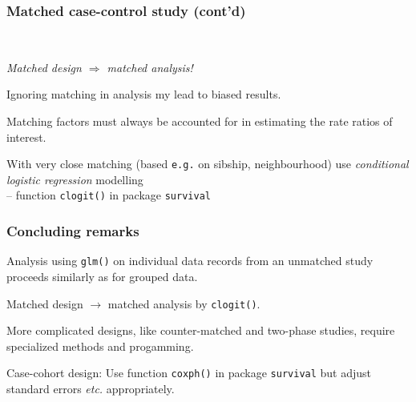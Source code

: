 \documentclass[handout,12pt]{beamer}
\begin{document}

\begin{frame}
\frametitle{Matched case-control study (cont'd)}
\ \\
\bi
\item
{\it Matched design $\Rightarrow$ matched analysis!}
\medskip
\item
Ignoring matching in analysis my lead to biased results.
\medskip
\item
Matching factors must always be accounted 
for in estimating the rate ratios of interest. 
\medskip
\item
With very close matching (based {\tt e.g.} on sibship, neighbourhood)
 use {\it  conditional logistic regression} modelling \\
 -- function {\tt clogit()} in package {\tt survival}
\ei

\end{frame} 

\begin{frame}
\frametitle{Concluding remarks}
\bi

\item
Analysis using {\tt glm()} on individual data records from 
an unmatched study proceeds similarly as for grouped data.
\medskip
\item
Matched design $\to$ matched analysis by \texttt{clogit()}.
\medskip
\item
More complicated designs, like counter-matched and two-phase studies,
require specialized methods and progamming.
\medskip
\item
Case-cohort design: Use function {\tt coxph()} in package {\tt survival}
but adjust standard errors {\it etc.} appropriately.  
\ei
\end{frame}
\end{document}
